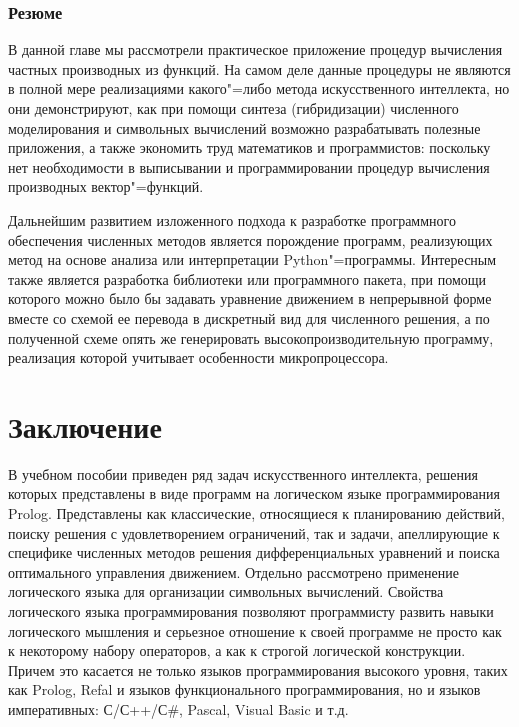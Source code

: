 \documentclass[a4paper,14pt, openany, twoside, final]{extbook} %
\begin{document}
\subsection{Резюме}

В данной главе мы рассмотрели практическое приложение процедур вычисления частных производных из функций.  На самом деле данные процедуры не являются в полной мере реализациями какого"=либо метода искусственного интеллекта, но они демонстрируют, как при помощи синтеза (гибридизации) численного моделирования и символьных вычислений возможно разрабатывать полезные приложения, а также экономить труд математиков и программистов: поскольку нет необходимости в выписывании и программировании процедур вычисления производных вектор"=функций.

Дальнейшим развитием изложенного подхода к разработке программного обеспечения численных методов является порождение программ, реализующих метод на основе анализа или интерпретации Python"=программы.  Интересным также является разработка библиотеки или программного пакета, при помощи которого можно было бы задавать уравнение движением в непрерывной форме вместе со схемой ее перевода в дискретный вид для численного решения, а по полученной схеме опять же генерировать высокопроизводительную программу, реализация которой учитывает особенности микропроцессора.




\chapter*{Заключение}

В учебном пособии приведен ряд задач искусственного интеллекта, решения которых представлены в виде программ на логическом языке программирования Prolog.  Представлены как классические, относящиеся к планированию действий, поиску решения с удовлетворением ограничений, так и задачи, апеллирующие к специфике численных методов решения дифференциальных уравнений и поиска оптимального управления движением.  Отдельно рассмотрено применение логического языка для организации символьных вычислений.  Свойства логического языка программирования позволяют программисту развить навыки логического мышления и серьезное отношение к своей программе не просто как к некоторому набору операторов, а как к строгой логической конструкции.  Причем это касается не только языков программирования высокого уровня, таких как Prolog, Refal и языков функционального программирования, но и языков императивных: С/С++/С\#, Pascal, Visual Basic и т.д.
\end{document}
